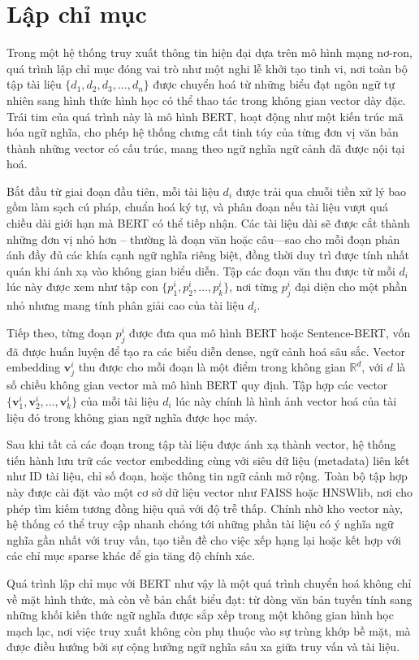 \section{Lập chỉ mục}
Trong một hệ thống truy xuất thông tin hiện đại dựa trên mô hình mạng nơ-ron, quá trình lập chỉ mục đóng vai trò như một nghi lễ khởi tạo tinh vi, nơi toàn bộ tập tài liệu \(\{d_1, d_2, d_3, \ldots, d_n\}\) được chuyển hoá từ những biểu đạt ngôn ngữ tự nhiên sang hình thức hình học có thể thao tác trong không gian vector dày đặc. Trái tim của quá trình này là mô hình BERT, hoạt động như một kiến trúc mã hóa ngữ nghĩa, cho phép hệ thống chưng cất tinh túy của từng đơn vị văn bản thành những vector có cấu trúc, mang theo ngữ nghĩa ngữ cảnh đã được nội tại hoá.

Bắt đầu từ giai đoạn đầu tiên, mỗi tài liệu \(d_i\) được trải qua chuỗi tiền xử lý bao gồm làm sạch cú pháp, chuẩn hoá ký tự, và phân đoạn nếu tài liệu vượt quá chiều dài giới hạn mà BERT có thể tiếp nhận. Các tài liệu dài sẽ được cắt thành những đơn vị nhỏ hơn -- thường là đoạn văn hoặc câu—sao cho mỗi đoạn phản ánh đầy đủ các khía cạnh ngữ nghĩa riêng biệt, đồng thời duy trì được tính nhất quán khi ánh xạ vào không gian biểu diễn. Tập các đoạn văn thu được từ mỗi \(d_i\) lúc này được xem như tập con \(\{p_1^i, p_2^i, \ldots, p_k^i\}\), nơi từng \(p_j^i\) đại diện cho một phần nhỏ nhưng mang tính phân giải cao của tài liệu \(d_i\).

Tiếp theo, từng đoạn \(p_j^i\) được đưa qua mô hình BERT hoặc Sentence-BERT, vốn đã được huấn luyện để tạo ra các biểu diễn dense, ngữ cảnh hoá sâu sắc. Vector embedding \(\mathbf{v}_{j}^{i}\) thu được cho mỗi đoạn là một điểm trong không gian \(\mathbb{R}^d\), với \(d\) là số chiều không gian vector mà mô hình BERT quy định. Tập hợp các vector \(\{\mathbf{v}_{1}^{i}, \mathbf{v}_{2}^{i}, \ldots, \mathbf{v}_{k}^{i}\}\) của mỗi tài liệu \(d_i\) lúc này chính là hình ảnh vector hoá của tài liệu đó trong không gian ngữ nghĩa được học máy.

Sau khi tất cả các đoạn trong tập tài liệu được ánh xạ thành vector, hệ thống tiến hành lưu trữ các vector embedding cùng với siêu dữ liệu (metadata) liên kết như ID tài liệu, chỉ số đoạn, hoặc thông tin ngữ cảnh mở rộng. Toàn bộ tập hợp này được cài đặt vào một cơ sở dữ liệu vector như FAISS hoặc HNSWlib, nơi cho phép tìm kiếm tương đồng hiệu quả với độ trễ thấp. Chính nhờ kho vector này, hệ thống có thể truy cập nhanh chóng tới những phần tài liệu có ý nghĩa ngữ nghĩa gần nhất với truy vấn, tạo tiền đề cho việc xếp hạng lại hoặc kết hợp với các chỉ mục sparse khác để gia tăng độ chính xác.

Quá trình lập chỉ mục với BERT như vậy là một quá trình chuyển hoá không chỉ về mặt hình thức, mà còn về bản chất biểu đạt: từ dòng văn bản tuyến tính sang những khối kiến thức ngữ nghĩa được sắp xếp trong một không gian hình học mạch lạc, nơi việc truy xuất không còn phụ thuộc vào sự trùng khớp bề mặt, mà được điều hướng bởi sự cộng hưởng ngữ nghĩa sâu xa giữa truy vấn và tài liệu.
